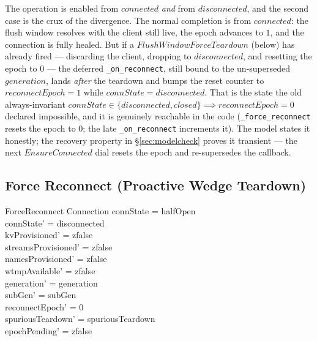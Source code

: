 \documentclass[a4paper,10pt,fleqn]{article}
\begin{document}
The operation is enabled from $connected$ \emph{and} from $disconnected$,
and the second case is the crux of the divergence.  The normal
completion is from $connected$: the flush window resolves with the client
still live, the epoch advances to $1$, and the connection is fully
healed.  But if a $FlushWindowForceTeardown$ (below) has already fired
--- discarding the client, dropping to $disconnected$, and resetting the
epoch to $0$ --- the deferred \texttt{\_on\_reconnect}, still bound to the
un-superseded $generation$, lands \emph{after} the teardown and bumps the
reset counter to $reconnectEpoch = 1$ while $connState = disconnected$.
That is the state the old always-invariant $connState \in \{
disconnected, closed \} \implies reconnectEpoch = 0$ declared impossible,
and it is genuinely reachable in the code (\texttt{\_force\_reconnect}
resets the epoch to $0$; the late \texttt{\_on\_reconnect} increments it).
The model states it honestly; the recovery property in
\S\ref{sec:modelcheck} proves it transient --- the next $EnsureConnected$
dial resets the epoch and re-supersedes the callback.

\subsection{Force Reconnect (Proactive Wedge Teardown)}

\begin{schema}{ForceReconnect}
  \Delta Connection
  \where
  connState = halfOpen \\
  connState' = disconnected \\
  kvProvisioned' = zfalse \\
  streamsProvisioned' = zfalse \\
  namesProvisioned' = zfalse \\
  wtmpAvailable' = zfalse \\
  generation' = generation \\
  subGen' = subGen \\
  reconnectEpoch' = 0 \\
  spuriousTeardown' = spuriousTeardown \\
  epochPending' = zfalse
\end{schema}
\end{document}
